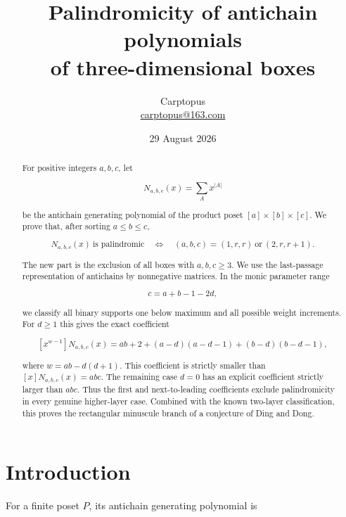 \documentclass[11pt]{article}
\title{Palindromicity of antichain polynomials\\
of three-dimensional boxes}
\author{Carptopus\\\href{mailto:carptopus@163.com}{carptopus@163.com}}
\date{29 August 2026}
\numberwithin{equation}{section}
\begin{document}
\maketitle

\begin{center}
\end{center}

\begin{abstract}


For positive integers $a,b,c$, let

\nopagebreak[4]
\[
N_{a,b,c}(x)=\sum_A x^{|A|}
\]

be the antichain generating polynomial of the product poset
$[a]\times[b]\times[c]$. We prove that, after sorting
$a\le b\le c$,

\nopagebreak[4]
\[
N_{a,b,c}(x)\ \text{is palindromic}
\quad\Longleftrightarrow\quad
(a,b,c)=(1,r,r)\ \text{or}\ (2,r,r+1).
\]

The new part is the exclusion of all boxes with $a,b,c\ge3$. We use the
last-passage representation of antichains by nonnegative matrices. In the
monic parameter range

\nopagebreak[4]
\[
c=a+b-1-2d,
\]

we classify all binary supports one below maximum and all possible weight
increments. For $d\ge1$ this gives the exact coefficient

\nopagebreak[4]
\[
[x^{w-1}]N_{a,b,c}(x)
=ab+2+(a-d)(a-d-1)+(b-d)(b-d-1),
\]

where $w=ab-d(d+1)$. This coefficient is strictly smaller than
$[x]N_{a,b,c}(x)=abc$. The remaining case $d=0$ has an explicit coefficient
strictly larger than $abc$. Thus the first and next-to-leading coefficients
exclude palindromicity in every genuine higher-layer case. Combined with the
known two-layer classification, this proves the rectangular minuscule branch
of a conjecture of Ding and Dong.

\end{abstract}

\section{Introduction}


For a finite poset $P$, its antichain generating polynomial is
\end{document}
